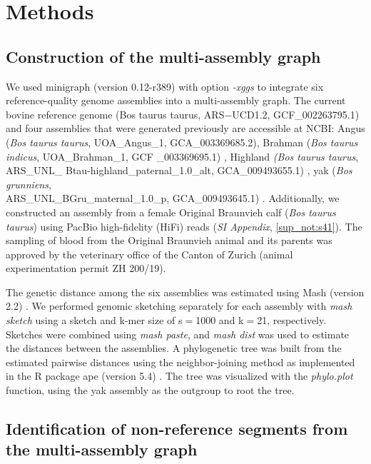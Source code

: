 \documentclass[../main.tex]{subfiles}
\begin{document}
\section{Methods}

\subsection*{Construction of the multi-assembly graph}

We used minigraph \citep{li2020design} (version 0.12-r389) with option \emph{-xggs} to integrate six reference-quality genome assemblies into a multi-assembly graph. The current bovine reference genome (Bos taurus taurus, ARS$-$UCD1.2, GCF\_002263795.1) and four assemblies that were generated previously are accessible at NCBI: Angus (\emph{Bos taurus taurus}, UOA\_Angus\_1, GCA\_003369685.2)\citep{low2020haplotype}, Brahman (\emph{Bos taurus indicus}, UOA\_Brahman\_1, GCF \_003369695.1) \citep{low2020haplotype}, Highland \emph{(Bos taurus taurus}, ARS\_UNL\_ Btau-highland\_paternal\_1.0\_alt, GCA\_009493655.1) \citep{rice2020continuous}, yak (\emph{Bos grunniens}, \\ ARS\_UNL\_BGru\_maternal\_1.0\_p, GCA\_009493645.1) \citep{rice2020continuous}. Additionally, we constructed an assembly from a female Original Braunvieh calf (\emph{Bos taurus taurus}) using PacBio high-fidelity (HiFi) reads (\emph{SI Appendix}, \ref{sup_not:s41}). The sampling of blood from the Original Braunvieh animal and its parents was approved by the veterinary office of the Canton of Zurich (animal experimentation permit ZH 200/19).

The genetic distance among the six assemblies was estimated using Mash (version 2.2) \citep{ondov2016mash}. We performed genomic sketching separately for each assembly with \emph{mash sketch } using a sketch and k-mer size of s$=$1000 and k$=$21, respectively. Sketches were combined using \emph{ mash paste}, and \emph{mash dist} was used to estimate the distances between the assemblies. A phylogenetic tree was built from the estimated pairwise distances using the neighbor-joining method \citep{saitou1987neighbor} as implemented in the R package ape (version 5.4) \citep{paradis2019ape}. The tree was visualized with the \emph{phylo.plot} function, using the yak assembly as the outgroup to root the tree.

\subsection*{Identification of non-reference segments from the multi-assembly graph}
\end{document}
